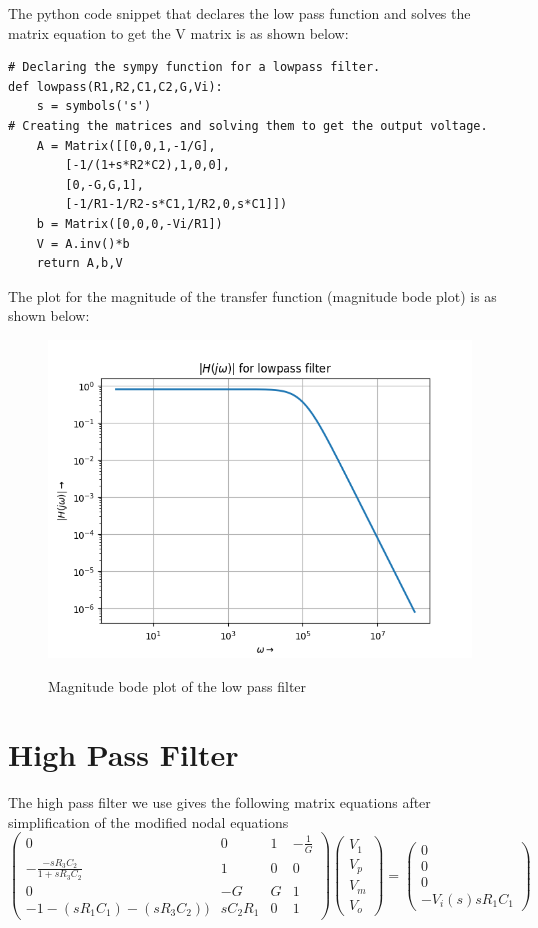 \documentclass[11pt, a4paper]{article}
\begin{document}
The python code snippet that declares the low pass function and solves the matrix equation to get the V matrix is as shown below:
\begin{verbatim}
# Declaring the sympy function for a lowpass filter.
def lowpass(R1,R2,C1,C2,G,Vi):
	s = symbols('s')
# Creating the matrices and solving them to get the output voltage.	
	A = Matrix([[0,0,1,-1/G],
		[-1/(1+s*R2*C2),1,0,0],
		[0,-G,G,1],
		[-1/R1-1/R2-s*C1,1/R2,0,s*C1]])
	b = Matrix([0,0,0,-Vi/R1])
	V = A.inv()*b
	return A,b,V
\end{verbatim}
The plot for the magnitude of the transfer function (magnitude bode plot) is as shown below:
\begin{figure}[!tbh]
   	\centering
   	\includegraphics[scale=0.6]{Figure_0.png}
   	\label{fig:32}
   	\caption{Magnitude bode plot of the low pass filter}
   \end{figure}

\section*{High Pass Filter}
The high pass filter we use gives the following matrix equations after simplification of the modified nodal equations
\[\begin{pmatrix} 0 & 0 & 1 & -\frac{1}{G} \\ -\frac{-sR_3C_2}{1+sR_3C_2} & 1 & 0 & 0 \\ 0 & -G & G & 1 \\ -1-(sR_1C_1)-(sR_3C_2)) & sC_2R_1 & 0 & 1 \end{pmatrix}\begin{pmatrix} V_1 \\ V_p \\ V_m \\ V_o \end{pmatrix} = \begin{pmatrix} 0 \\ 0 \\ 0 \\ -V_i(s)sR_1C_1 \end{pmatrix}\]
\end{document}
